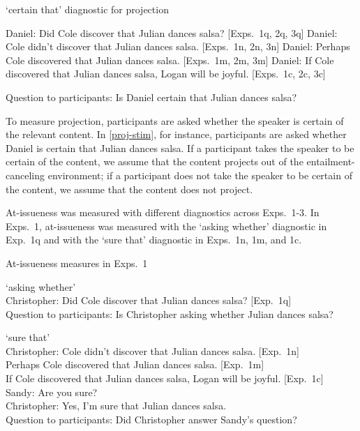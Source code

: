 \documentclass[11pt,fleqn]{article}
\newcommand{\6}{\mbox{$[\hspace*{-.6mm}[$}}
\newcommand{\9}{\mbox{$]\hspace*{-.6mm}]$}}
\begin{document}
\begin{exe}
\ex\label{proj-stim} `certain that' diagnostic for projection
\begin{xlist}
\ex Daniel: Did Cole discover that Julian dances salsa? \hfill [Exps.~1q, 2q, 3q]
\ex Daniel: Cole didn't discover that Julian dances salsa. \hfill [Exps.~1n, 2n, 3n]
\ex Daniel: Perhaps Cole discovered that Julian dances salsa. \hfill [Exps.~1m, 2m, 3m]
\ex Daniel: If Cole discovered that Julian dances salsa, Logan will be joyful. \hfill [Exps.~1c, 2c, 3c]
\end{xlist}
Question to participants: Is Daniel certain that Julian dances salsa?
\end{exe}
To measure projection, participants are asked whether the speaker is certain of the relevant content. In \ref{proj-stim}, for instance, participants are asked whether Daniel is certain that Julian dances salsa. If a participant takes the speaker to be certain of the content, we assume that the content projects out of the entailment-canceling environment; if a participant does not take the speaker to be certain of the content, we assume that the content does not project. 

At-issueness was measured with different diagnostics across Exps.~1-3. In Exps.~1, at-issueness was measured with the `asking whether' diagnostic in Exp.~1q and with the `sure that' diagnostic in Exps.~1n, 1m, and 1c.

\begin{exe}
\ex\label{ai-exps1} At-issueness measures in Exps.~1
\begin{xlist}
\ex `asking whether' \\ Christopher: Did Cole discover that Julian dances salsa? \hfill [Exp.~1q]
\\ Question to participants: Is Christopher asking whether Julian dances salsa?

\ex `sure that' \\ Christopher: Cole didn't discover that Julian dances salsa.  \hfill [Exp.~1n]
\\ \hspace*{2cm} Perhaps Cole discovered that Julian dances salsa.  \hfill [Exp.~1m]
\\ \hspace*{2cm} If Cole discovered that Julian dances salsa, Logan will be joyful.  \hfill [Exp.~1c]
\\ Sandy: Are you sure?
\\ Christopher: Yes, I'm sure that Julian dances salsa.
\\ Question to participants: Did Christopher answer Sandy's question?

\end{xlist}
\end{exe}
\end{document}
